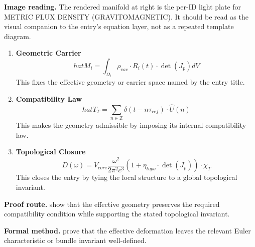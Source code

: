 \begin{samepage}
\noindent\begin{minipage}[t]{0.45\linewidth}
\vspace{0pt}
\raggedright
\scriptsize\textbf{Image reading.} The rendered manifold at right is the per-ID light plate for METRIC FLUX DENSITY (GRAVITOMAGNETIC). It should be read as the visual companion to the entry's equation layer, not as a repeated template diagram.\par
\end{minipage}\hfill
\begin{minipage}[t]{0.53\linewidth}
\vspace*{-0.10in}
\raggedright
{}
\end{minipage}
\end{samepage}

\clearpage


\begin{enumerate}[leftmargin=1.6em,itemsep=9pt,topsep=6pt]
\item \textbf{Geometric Carrier}
\[
hat{M}_i = \int_{\Omega_i} \rho_{vac} \cdot R_i(t) \cdot \det(J_p) dV
\]
This fixes the effective geometry or carrier space named by the entry title.

\item \textbf{Compatibility Law}
\[
hat{T}_T = \sum_{n \in \mathbb{Z}} \delta(t - n\tau_{ref}) \cdot \hat{U}(n)
\]
This makes the geometry admissible by imposing its internal compatibility law.

\item \textbf{Topological Closure}
\[
D(\omega) = V_{core} \frac{\omega^2}{2\pi^2 c^3} (1 + \eta_{topo} \cdot \det(J_p)) \cdot \chi_T
\]
This closes the entry by tying the local structure to a global topological invariant.
\end{enumerate}

\textbf{Proof route.} show that the effective geometry preserves the required compatibility condition while supporting the stated topological invariant.

\textbf{Formal method.} prove that the effective deformation leaves the relevant Euler characteristic or bundle invariant well-defined.

\medskip
{}

